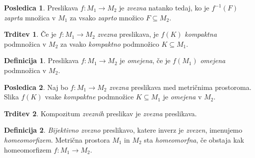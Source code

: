 \documentclass[11pt]{article}
\theoremstyle{definition}
\newtheorem{definicija}{Definicija}[section]
\theoremstyle{definition}
\newtheorem{trditev}{Trditev}[section]
\theoremstyle{definition}
\newtheorem*{posledica}{Posledica}
\begin{document}
\begin{posledica}

Preslikava $f: M_1 \rightarrow M_2$ je \textit{zvezna} natanko tedaj, ko je $f^{-1}(F)$ \textit{zaprta} množica v $M_1$ za vsako \textit{zaprto} množico $F \subseteq M_2$.

\end{posledica}
\vspace{0.5cm}

\begin{trditev}

Če je $f: M_1 \rightarrow M_2$ \textit{zvezna} preslikava, je $f(K)$ \textit{kompaktna} podmnožica v $M_2$ za vsako \textit{kompaktno} podmnožico $K \subseteq M_1$.

\end{trditev}
\vspace{0.5cm}

\begin{definicija}

Preslikava $f: M_1 \rightarrow M_2$ je \textit{omejena}, če je $f(M_1)$ \textit{omejena} podmnožica v $M_2$.

\end{definicija}
\vspace{0.5cm}

\begin{posledica}

Naj bo $f: M_1 \rightarrow M_2$ \textit{zvezna} preslikava med metričnima prostoroma. Slika $f(K)$ vsake \textit{kompaktne} podmnožice $K \subseteq M_1$ je \textit{omejena} v $M_2$.

\end{posledica}
\vspace{0.5cm}

\begin{trditev}

Kompozitum \textit{zveznih} preslikav je \textit{zvezna} preslikava.

\end{trditev}
\vspace{0.5cm}

\begin{definicija}

\textit{Bijektivno zvezno} preslikavo, katere inverz je \textit{zvezen}, imenujemo \textit{homeomorfizem}. Metrična prostora $M_1$ in $M_2$ sta \textit{homeomorfna}, če obstaja kak homeomorfizem $f: M_1 \rightarrow M_2$.

\end{definicija}
\vspace{0.5cm}
\end{document}
